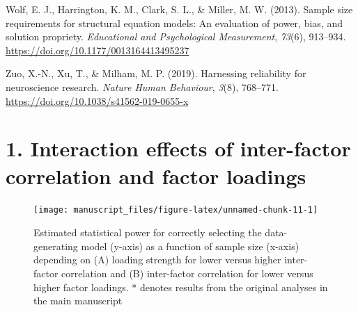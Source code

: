 \documentclass[
  man,floatsintext]{apa6}
\newlength{\cslhangindent}
\newlength{\cslentryspacingunit} %
\newenvironment{CSLReferences}[2] %
 {%
  \setlength{\parindent}{0pt}
  \ifodd #1
  \let\oldpar\par
  \def\par{\hangindent=\cslhangindent\oldpar}
  \fi
  \setlength{\parskip}{#2\cslentryspacingunit}
 }%
 {}
\begin{document}
\begin{CSLReferences}{1}{0}
\leavevmode{}%
Wolf, E. J., Harrington, K. M., Clark, S. L., \& Miller, M. W. (2013). Sample size requirements for structural equation models: An evaluation of power, bias, and solution propriety. \emph{Educational and Psychological Measurement}, \emph{73}(6), 913--934. \url{https://doi.org/10.1177/0013164413495237}

\leavevmode{}%
Zuo, X.-N., Xu, T., \& Milham, M. P. (2019). Harnessing reliability for neuroscience research. \emph{Nature Human Behaviour}, \emph{3}(8), 768--771. \url{https://doi.org/10.1038/s41562-019-0655-x}

\end{CSLReferences}

\newpage

\hypertarget{appendix-appendix}{%
\appendix}


\hypertarget{interaction-effects-of-inter-factor-correlation-and-factor-loadings}{%
\section{1. Interaction effects of inter-factor correlation and factor loadings}\label{interaction-effects-of-inter-factor-correlation-and-factor-loadings}}

\begin{figure}

{\centering \texttt{[image: manuscript\_files/figure-latex/unnamed-chunk-11-1]} 

}

\caption{Estimated statistical power for correctly selecting the data-generating model (y-axis) as a function of sample size (x-axis) depending on (A) loading strength for lower versus higher inter-factor correlation and (B) inter-factor correlation for lower versus higher factor loadings. * denotes results from the original analyses in the main manuscript}\label{fig:unnamed-chunk-11}
\end{figure}
\end{document}
